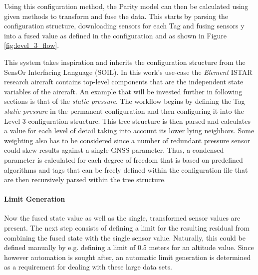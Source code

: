 Using this configuration method, the Parity model can then be calculated using given methods to transform and fuse the data. This starts by parsing the configuration structure, downloading sensors for each Tag and fusing sensors y into a fused value as defined in the configuration and as shown in Figure \ref{fig:level_3_flow}.



This system takes inspiration and inherits the configuration structure from the SensOr Interfacing Language (SOIL)\cite{behrens_domain-specific_2021}. In this work's use-case the \textit{Element} ISTAR research aircraft contains top-level components that are the independent state variables of the aircraft. An example that will be invested further in following sections is that of the \textit{static pressure}. The workflow begins by defining the Tag \textit{static pressure} in the permanent configuration and then configuring it into the Level 3-configuration structure. This tree structure is then parsed and calculates a value for each level of detail taking into account its lower lying neighbors. Some weighting also has to be considered since a number of redundant pressure sensor could skew results against a single GNSS parameter. Thus, a condensed parameter is calculated for each degree of freedom that is based on predefined algorithms and tags that can be freely defined within the configuration file that are then recursively parsed within the tree structure.

\paragraph{Limit Generation}
Now the fused state value as well as the single, transformed sensor values are present. The next step consists of defining a limit for the resulting residual from combining the fused state with the single sensor value. Naturally, this could be defined manually by e.g. defining a limit of 0.5 meters for an altitude value. Since however automation is sought after, an automatic limit generation is determined as a requirement for dealing with these large data sets.

